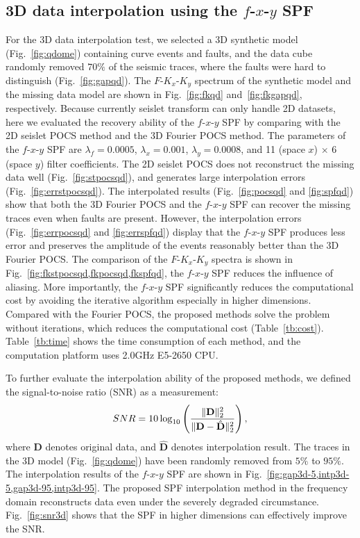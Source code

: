 \subsection{3D data interpolation using the $f$-$x$-$y$ SPF}

For the 3D data interpolation test, we selected a 3D synthetic model
(Fig.~\ref{fig:qdome}) containing curve events and faults, and the
data cube randomly removed $70\%$ of the seismic traces, where the
faults were hard to distinguish (Fig.~\ref{fig:gapqd}).  The
$F$-$K_{x}$-$K_{y}$ spectrum of the synthetic model and the missing
data model are shown in Fig.~\ref{fig:fkqd} and~\ref{fig:fkgapqd},
respectively. Because currently seislet transform can only handle 2D
datasets, here we evaluated the recovery ability of the $f$-$x$-$y$
SPF by comparing with the 2D seislet POCS method and the 3D Fourier
POCS method.  The parameters of the $f$-$x$-$y$ SPF are
$\lambda_{f}=0.0005$, $\lambda_{x}=0.001$, $\lambda_{y}=0.0008$, and
11 (space $x$) $\times$ 6 (space $y$) filter coefficients.  The 2D
seislet POCS does not reconstruct the missing data well
(Fig.~\ref{fig:stpocsqd}), and generates large interpolation errors
(Fig.~\ref{fig:errstpocsqd}).  The interpolated results
(Fig.~\ref{fig:pocsqd} and \ref{fig:spfqd}) show that both the 3D
Fourier POCS and the $f$-$x$-$y$ SPF can recover the missing traces
even when faults are present. However, the interpolation errors
(Fig.~\ref{fig:errpocsqd} and \ref{fig:errspfqd}) display that the
$f$-$x$-$y$ SPF produces less error and preserves the amplitude of the
events reasonably better than the 3D Fourier POCS.  The comparison of
the $F$-$K_{x}$-$K_{y}$ spectra is shown in
Fig.~\ref{fig:fkstpocsqd,fkpocsqd,fkspfqd}, the $f$-$x$-$y$ SPF
reduces the influence of aliasing.  More importantly, the $f$-$x$-$y$
SPF significantly reduces the computational cost by avoiding the
iterative algorithm especially in higher dimensions.  Compared with
the Fourier POCS, the proposed methods solve the problem without
iterations, which reduces the computational cost
(Table~\ref{tb:cost}).  Table~\ref{tb:time} shows the time consumption
of each method, and the computation platform uses 2.0GHz E5-2650 CPU.

To further evaluate the interpolation ability of the proposed methods,
we defined the signal-to-noise ratio (SNR) as a measurement:
\begin{equation}
    \label{eq:snr}
    SNR = 10 \log_{10} \left(
    \frac{\Arrowvert \mathbf{D} \Arrowvert_{2}^{2}}
    {\Arrowvert\mathbf{D} - \hat{\mathbf{D}}\Arrowvert_{2}^{2}}
    \right),
\end{equation}
where $\mathbf{D}$ denotes original data, and $\hat{\mathbf{D}}$
denotes interpolation result. The traces in the 3D model
(Fig.~\ref{fig:qdome}) have been randomly removed from $5\%$ to
$95\%$. The interpolation results of the $f$-$x$-$y$ SPF are shown in
Fig.~\ref{fig:gap3d-5,intp3d-5,gap3d-95,intp3d-95}.  The proposed SPF
interpolation method in the frequency domain reconstructs data even
under the severely degraded circumstance.  Fig.~\ref{fig:snr3d} shows
that the SPF in higher dimensions can effectively improve the SNR.

